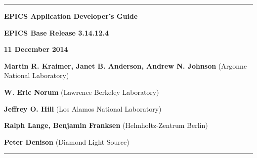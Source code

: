 \hrule

\vspace{1in}

\noindent \Huge \textbf{EPICS Application Developer's Guide}

\vspace{0.5in}

\noindent \Large \textbf{EPICS Base Release 3.14.12.4}

\noindent \textbf{11 December 2014}

\vspace{0.5in}

\normalsize
\noindent \textbf{Martin R. Kraimer, Janet B. Anderson, Andrew N. Johnson} (Argonne National Laboratory)

\noindent \textbf{W. Eric Norum} (Lawrence Berkeley Laboratory)

\noindent \textbf{Jeffrey O. Hill} (Los Alamos National Laboratory)

\noindent \textbf{Ralph Lange, Benjamin Franksen} (Helmholtz-Zentrum Berlin)

\noindent \textbf{Peter Denison} (Diamond Light Source)

\vspace{1in}
\hrule
